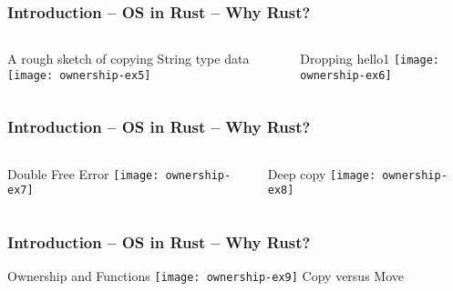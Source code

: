 \begin{frame}[plain]
	\frametitle{Introduction -- OS in Rust -- Why Rust?}
	
	
	
	\begin{columns}
		
		\begin{column}{.5\textwidth}
			\Large
			A rough sketch of copying String type data 
			\texttt{[image: ownership-ex5]}
			
		\end{column}
		
		\begin{column}{.5\textwidth}
			
			\Large
			
			
			Dropping hello1
			\texttt{[image: ownership-ex6]}
			
		\end{column}
		
		
	\end{columns}
	
	
\end{frame}


\begin{frame}[plain]
	\frametitle{Introduction -- OS in Rust -- Why Rust?}
	
	
	
	\begin{columns}
		
		\begin{column}{.3\textwidth}
			\Large
			Double Free Error
			\texttt{[image: ownership-ex7]}
			
		\end{column}
		
		\begin{column}{.7\textwidth}
			
			\Large
			
			
			Deep copy
			\texttt{[image: ownership-ex8]}
			
		\end{column}
		
		
	\end{columns}
	
	
\end{frame}


\begin{frame}[plain]	
	\frametitle{Introduction -- OS in Rust -- Why Rust?}
	\centering
	\Large
	Ownership and Functions
	\texttt{[image: ownership-ex9]}
	Copy versus Move
\end{frame}


